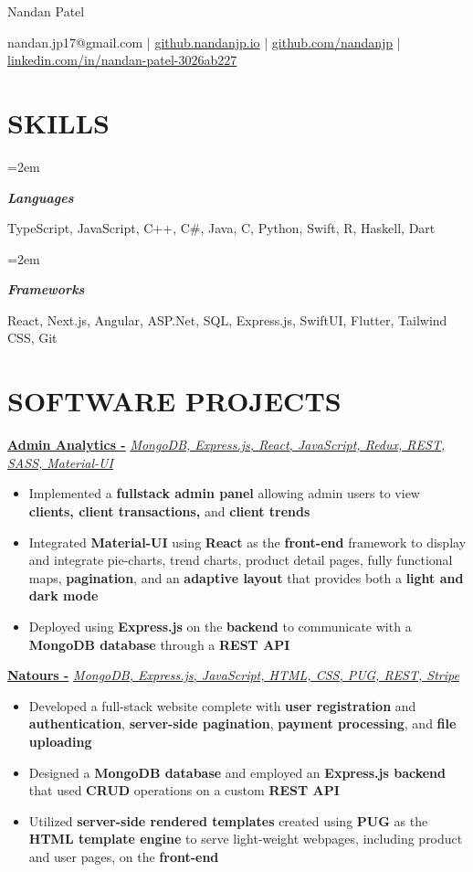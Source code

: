 \documentclass[10pt]{article}
\newlength{\spacebox}
\newcommand{\sepspace}{\vspace*{0.5em}}   %
\newcommand{\MyName}[1]{ %
    \huge \usefont{OT1}{phv}{b}{n} \hfill #1
    \par \normalsize \normalfont}
\newcommand{\NewPart}[1]{\section*{\uppercase{#1}}}
\newcommand{\PersonalEntry}[2]{
    \noindent\hangindent=2em\hangafter=0 %
    \parbox{\spacebox}{                  %
    \textit{#1}}                      %
    \hspace{1.5em} #2 \par}              %
\newcommand{\SkillsEntry}[2]{                %
    \noindent\hangindent=2em\hangafter=0 %
    \parbox{\spacebox}{                  %
    \textit{#1}}                    %
    \hspace{1.5em} #2 \par}              %
\newcommand{\EducationEntry}[4]{
    \noindent \textbf{#1} \hfill      %
    \colorbox{Black}{
      \parbox{8.5em}{
      \hfill\color{White}#2}} \par  %
    \noindent \textit{#3} \par        %
    \noindent\hangindent=2em\hangafter=0 \small #4 %
    \normalsize \par}
\newcommand{\ProjectEntry}[4]{         %
    \noindent \textbf{#1} \noindent \textit{#3} \hfill {#2} \par
    \noindent \small #4 %
    \normalsize \par}
\begin{document}
    
\MyName{Nandan Patel}
\sepspace
{\small \hfill \faEnvelope \space nandan.jp17@gmail.com | \faLink \space \href{https://github.nandanjp.io}{github.nandanjp.io} | \faGithub \space\href{https://github.com/nandanjp}{github.com/nandanjp} | \faLinkedin \space\href{https://linkedin.com/in/nandan-patel-3026ab227}{linkedin.com/in/nandan-patel-3026ab227}
\NewPart{Skills}{}
\SkillsEntry
{\textbf{Languages}}
{TypeScript, JavaScript, C++, C\#, Java, C, Python, Swift, R, Haskell, Dart}
\SkillsEntry
{\textbf{Frameworks}} 
{React, Next.js, Angular, ASP.Net, SQL, Express.js, SwiftUI, Flutter, Tailwind CSS, Git}
\NewPart{Software Projects}{}

\ProjectEntry
{\normalsize\href{https://github.com/nandanjp/Admin-Analytics}
{Admin Analytics -}}{}
{\normalsize\href{https://github.com/nandanjp/Admin-Analytics}
{MongoDB, Express.js, React, JavaScript, Redux, REST, SASS, Material-UI}}
{\begin{itemize} \itemsep -1pt
    \item Implemented a \textbf{fullstack admin panel} allowing admin users to view \textbf{clients, client transactions,} and \textbf{client trends}
    \item Integrated \textbf{Material-UI} using \textbf{React} as the \textbf{front-end} framework to display and integrate pie-charts, trend charts, product detail pages, fully functional maps, \textbf{pagination}, and an \textbf{adaptive layout} that provides both a \textbf{light and dark mode} 
    \item Deployed using \textbf{Express.js} on the \textbf{backend} to communicate with a \textbf{MongoDB database} through a \textbf{REST API}
    \end{itemize}
}

\ProjectEntry
{\normalsize\href{https://github.com/nandanjp/Natours/tree/main}
{Natours -}}{}
{\normalsize\href{https://github.com/nandanjp/Natours/tree/main}
{MongoDB, Express.js, JavaScript, HTML, CSS, PUG, REST, Stripe}}
{\begin{itemize} \itemsep -1pt
    \item Developed a full-stack website complete with \textbf{user registration} and \textbf{authentication}, \textbf{server-side pagination}, \textbf{payment processing}, and \textbf{file uploading}
    \item Designed a \textbf{MongoDB database} and employed an \textbf{Express.js backend} that used \textbf{CRUD} operations on a custom \textbf{REST API}
    \item Utilized \textbf{server-side rendered templates} created using \textbf{PUG} as the \textbf{HTML template engine} to serve light-weight webpages, including product and user pages, on the \textbf{front-end}
    \end{itemize}
}

}
\end{document}
